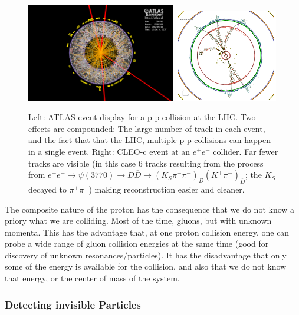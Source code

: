 \begin{figure}
\includegraphics[width=0.58\textwidth]{fig/ATLAS_run204769_evt71902630}
\includegraphics[width=0.4\textwidth]{fig/CLEOc_D2Kspipi_D2Kpi_Event}
\caption{Left: ATLAS event display for a p-p collision at the LHC. Two effects are compounded: The large number of track in each event, and the fact that that the LHC, multiple p-p collisions can happen in a single event. Right: CLEO-c event at an $e^+ e^-$ collider. Far fewer tracks are visible (in this case 6 tracks resulting from the process from $e^+ e^- \to \psi(3770) \to D\overline{D} \to (K_S\pi^+\pi^-)_D (K^+\pi^-)_{\overline{D}}$; the $K_S$ decayed to $\pi^+ \pi^-$) making reconstruction easier and cleaner.}
\end{figure}


The composite nature of the proton has the consequence that we do not know a priory what we are colliding. Most of the time, gluons, but with unknown momenta. 
This has the advantage that, at one proton collision energy, one can probe a wide range of gluon collision energies at the same time (good for discovery of unknown resonances/particles). 
It has the disadvantage that only some of the energy is available for the collision, and also that we do not know that energy, or the center of mass of the system. 

\subsubsection{Detecting invisible Particles}

